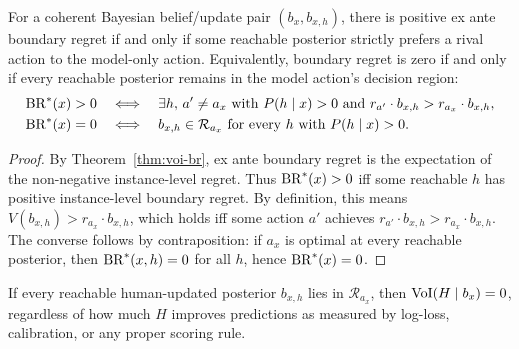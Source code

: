\begin{theorem}\label{thm:facet-bridge}
For a coherent Bayesian belief/update pair $(b_x,b_{x,h})$, there is positive ex ante boundary regret if and only if some reachable posterior strictly prefers a rival action to the model-only action.
Equivalently, boundary regret is zero if and only if every reachable posterior remains in the model action's decision region:
\begin{equation}
    \begin{aligned}
    \operatorname{BR}^{*}(x) > 0
    &\quad\Longleftrightarrow\quad
        \exists h,\, a' \neq a_x
        \text{ with } P(h \mid x) > 0
        \text{ and }
        r_{a'} \cdot b_{x,h} > r_{a_x} \cdot b_{x,h},\\
    \operatorname{BR}^{*}(x) = 0
    &\quad\Longleftrightarrow\quad
        b_{x,h} \in \mathcal{R}_{a_x}
        \text{ for every } h \text{ with } P(h \mid x) > 0.
    \end{aligned}
\label{eq:facet-activation}
\end{equation}
\end{theorem}
\vspace{-1.25em}
\begin{proof}
By Theorem~\ref{thm:voi-br}, ex ante boundary regret is the expectation of the non-negative instance-level regret.
Thus $\operatorname{BR}^{*}(x) > 0$ iff some reachable $h$ has positive instance-level boundary regret.
By definition, this means $V(b_{x,h}) > r_{a_x} \cdot b_{x,h}$, which holds iff some action $a'$ achieves $r_{a'} \cdot b_{x,h} > r_{a_x} \cdot b_{x,h}$.
The converse follows by contraposition: if $a_x$ is optimal at every reachable posterior, then $\operatorname{BR}^{*}(x,h) = 0$ for all $h$, hence $\operatorname{BR}^{*}(x) = 0$.
\end{proof}

\begin{corollary}\label{cor:zero-dv}
If every reachable human-updated posterior $b_{x,h}$ lies in $\mathcal{R}_{a_x}$, then $\operatorname{VoI}(H \mid b_x) = 0$, regardless of how much $H$ improves predictions as measured by log-loss, calibration, or any proper scoring rule.
\end{corollary}

